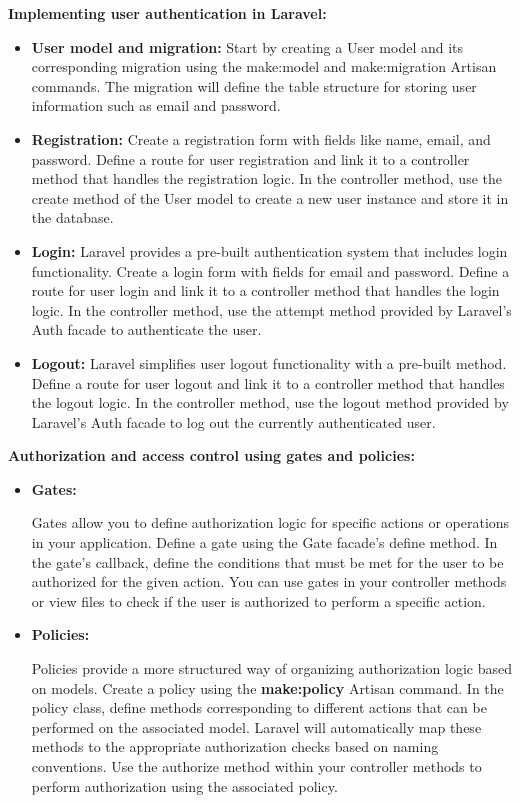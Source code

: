 \textbf{Implementing user authentication in Laravel:}
\begin{itemize}

\item \textbf{User model and migration:}
        Start by creating a User model and its corresponding migration using the make:model and make:migration Artisan commands.
        The migration will define the table structure for storing user information such as email and password.

\item \textbf{Registration:}
        Create a registration form with fields like name, email, and password.
        Define a route for user registration and link it to a controller method that handles the registration logic.
        In the controller method, use the create method of the User model to create a new user instance and store it in the database.

\item \textbf{Login:}
        Laravel provides a pre-built authentication system that includes login functionality.
        Create a login form with fields for email and password.
        Define a route for user login and link it to a controller method that handles the login logic.
        In the controller method, use the attempt method provided by Laravel's Auth facade to authenticate the user.

\item \textbf{Logout:}
        Laravel simplifies user logout functionality with a pre-built method.
        Define a route for user logout and link it to a controller method that handles the logout logic.
        In the controller method, use the logout method provided by Laravel's Auth facade to log out the currently authenticated user.
\end{itemize}
\textbf{Authorization and access control using gates and policies:}
\begin{itemize}
    \item \textbf{Gates:}   
        
    Gates allow you to define authorization logic for specific actions or operations in your application.
        Define a gate using the Gate facade's define method.
        In the gate's callback, define the conditions that must be met for the user to be authorized for the given action.
        You can use gates in your controller methods or view files to check if the user is authorized to perform a specific action.

        \item \textbf{Policies:} 
        
        Policies provide a more structured way of organizing authorization logic based on models.
        Create a policy using the \textbf{make:policy} Artisan command.
        In the policy class, define methods corresponding to different actions that can be performed on the associated model.
        Laravel will automatically map these methods to the appropriate authorization checks based on naming conventions.
        Use the authorize method within your controller methods to perform authorization using the associated policy.
    \end{itemize}
